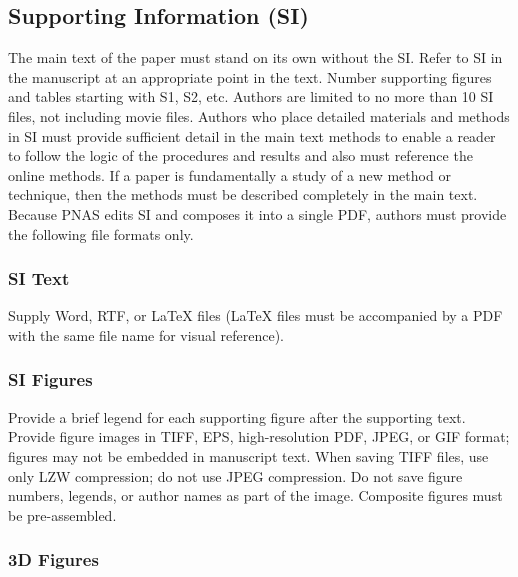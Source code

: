 \documentclass[9pt,twocolumn,twoside,]{pnas-new}
\begin{document}
\hypertarget{supporting-information-si}{%
\subsection*{Supporting Information
(SI)}\label{supporting-information-si}}

The main text of the paper must stand on its own without the SI. Refer
to SI in the manuscript at an appropriate point in the text. Number
supporting figures and tables starting with S1, S2, etc. Authors are
limited to no more than 10 SI files, not including movie files. Authors
who place detailed materials and methods in SI must provide sufficient
detail in the main text methods to enable a reader to follow the logic
of the procedures and results and also must reference the online
methods. If a paper is fundamentally a study of a new method or
technique, then the methods must be described completely in the main
text. Because PNAS edits SI and composes it into a single PDF, authors
must provide the following file formats only.

\hypertarget{si-text}{%
\subsubsection*{SI Text}\label{si-text}}

Supply Word, RTF, or LaTeX files (LaTeX files must be accompanied by a
PDF with the same file name for visual reference).

\hypertarget{si-figures}{%
\subsubsection*{SI Figures}\label{si-figures}}

Provide a brief legend for each supporting figure after the supporting
text. Provide figure images in TIFF, EPS, high-resolution PDF, JPEG, or
GIF format; figures may not be embedded in manuscript text. When saving
TIFF files, use only LZW compression; do not use JPEG compression. Do
not save figure numbers, legends, or author names as part of the image.
Composite figures must be pre-assembled.

\hypertarget{d-figures}{%
\subsubsection*{3D Figures}\label{d-figures}}
\end{document}
